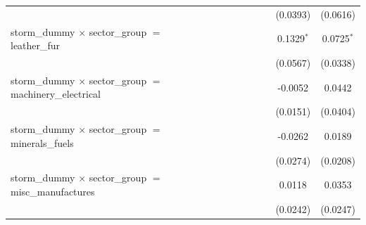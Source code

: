 \begin{tabular}{lcccccccc}
                                                                                  &                       &                       &                       &                       &                       &                       & (0.0393)              & (0.0616)\\   
   storm\_dummy $\times$ sector\_group $=$ leather\_fur                           &                       &                       &                       &                       &                       &                       & 0.1329$^{*}$          & 0.0725$^{*}$\\   
                                                                                  &                       &                       &                       &                       &                       &                       & (0.0567)              & (0.0338)\\   
   storm\_dummy $\times$ sector\_group $=$ machinery\_electrical                  &                       &                       &                       &                       &                       &                       & -0.0052               & 0.0442\\   
                                                                                  &                       &                       &                       &                       &                       &                       & (0.0151)              & (0.0404)\\   
   storm\_dummy $\times$ sector\_group $=$ minerals\_fuels                        &                       &                       &                       &                       &                       &                       & -0.0262               & 0.0189\\   
                                                                                  &                       &                       &                       &                       &                       &                       & (0.0274)              & (0.0208)\\   
   storm\_dummy $\times$ sector\_group $=$ misc\_manufactures                     &                       &                       &                       &                       &                       &                       & 0.0118                & 0.0353\\   
                                                                                  &                       &                       &                       &                       &                       &                       & (0.0242)              & (0.0247)\\   

\end{tabular}
